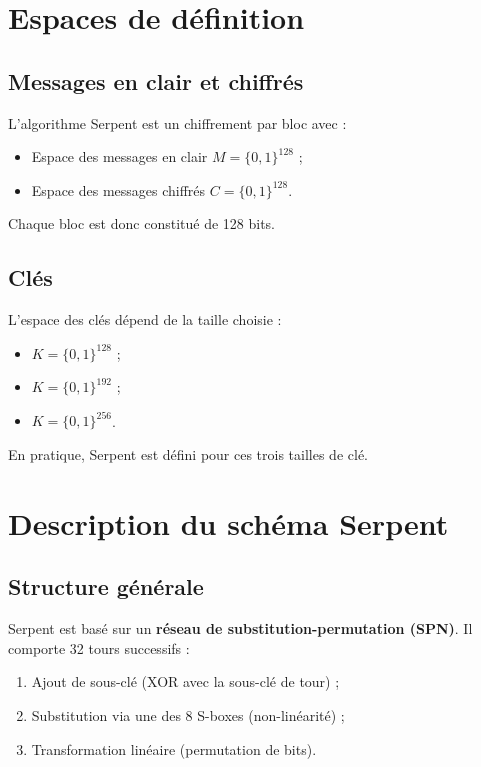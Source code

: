 \documentclass[12pt,a4paper]{report}
\begin{document}
\tableofcontents

\section*{Espaces de définition}

\subsection{Messages en clair et chiffrés}
L’algorithme Serpent est un chiffrement par bloc avec :
\begin{itemize}
    \item Espace des messages en clair $M = \{0,1\}^{128}$ ;
    \item Espace des messages chiffrés $C = \{0,1\}^{128}$.
\end{itemize}
Chaque bloc est donc constitué de 128 bits.

\subsection{Clés}
L’espace des clés dépend de la taille choisie :
\begin{itemize}
    \item $K = \{0,1\}^{128}$ ;
    \item $K = \{0,1\}^{192}$ ;
    \item $K = \{0,1\}^{256}$.
\end{itemize}
En pratique, Serpent est défini pour ces trois tailles de clé.

\section*{Description du schéma Serpent}

\setcounter{subsection}{0}

\subsection{Structure générale}
Serpent est basé sur un \textbf{réseau de substitution-permutation (SPN)}.  
Il comporte 32 tours successifs :
\begin{enumerate}
    \item Ajout de sous-clé (XOR avec la sous-clé de tour) ;
    \item Substitution via une des 8 S-boxes (non-linéarité) ;
    \item Transformation linéaire (permutation de bits).
\end{enumerate}
\end{document}
